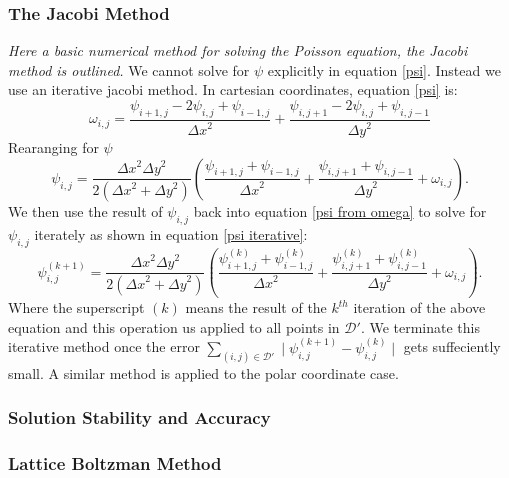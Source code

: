 \documentclass{article}
\begin{document}
\subsubsection*{The Jacobi Method}
{\it{Here a basic numerical method for solving the Poisson equation, the Jacobi method is outlined.}}
We cannot solve for $\psi$ explicitly in equation \ref{psi}. Instead we use an iterative jacobi method. In cartesian coordinates, equation \ref{psi} is:
\begin{equation}
	\omega_{i,j} = \frac{\psi_{i+1,j} - 2 \psi_{i,j} + \psi_{i-1,j}  }{{\Delta x}^2} + \frac{\psi_{i,j+1} - 2 \psi_{i,j} + \psi_{i,j-1}  }{{\Delta y}^2}
	\label{psi disc}
\end{equation}
Rearanging for $\psi$
\begin{equation}
	\psi_{i,j} = \frac{{\Delta x}^2 {\Delta y}^2  }{2({\Delta x}^2  + {\Delta y}^2)} (\frac{\psi_{i+1,j} +\psi_{i-1,j} }{{\Delta x}^2} + \frac{\psi_{i,j+1} +\psi_{i,j-1}  }{{\Delta y}^2 }  + \omega_{i,j}).
	\label{psi from omega}
\end{equation}
We then use the result of $\psi_{i,j}$ back into equation \ref{psi from omega} to solve for $\psi_{i,j}$ iterately as shown in equation \ref{psi iterative}:
\begin{equation}
	\psi_{i,j}^{(k+1)} = \frac{{\Delta x}^2 {\Delta y}^2  }{2({\Delta x}^2  + {\Delta y}^2)} (\frac{\psi_{i+1,j}^{(k)} +\psi_{i-1,j}^{(k)}  }{{\Delta x}^2} + \frac{\psi_{i,j+1}^{(k)} +\psi_{i,j-1}^{(k)}  }{{\Delta y}^2 } + \omega_{i,j}).
	\label{psi iterative}
\end{equation}
Where the superscript $(k)$ means the result of the $k^{th}$ iteration of the above equation and this operation us applied to all points in $\mathcal{D}'$.
 We terminate this iterative method once the error $\sum_{(i,j) \in \mathcal{D'}} \mid \psi_{i,j}^{(k+1)} - \psi_{i,j}^{(k)} \mid$ gets suffeciently small. A similar method is applied to the polar coordinate case. 
 



\subsubsection*{Solution Stability and Accuracy}

 


\subsubsection*{Lattice Boltzman Method}
\end{document}
